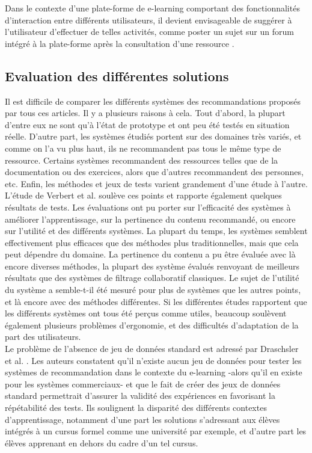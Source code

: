\documentclass[conference]{./sty/IEEEtran}
\begin{document}
Dans le contexte d'une plate-forme de e-learning comportant des fonctionnalités
d'interaction entre différents utilisateurs, il devient envisageable de
suggérer à l'utilisateur d'effectuer de telles activités, comme poster un sujet
sur un forum intégré à la plate-forme après la consultation d'une ressource
\cite{Liou:2014:CPL:2617848.2617854}. \\

\subsection{Evaluation des différentes solutions}

Il est difficile de comparer les différents systèmes des recommandations
proposés par tous ces articles. Il y a plusieurs raisons à cela. Tout d'abord,
la plupart d'entre eux ne sont qu'à l'état de prototype et ont peu été testés
en situation réelle. D'autre part, les systèmes étudiés portent sur des
domaines très variés, et comme on l'a vu plus haut, ils ne recommandent pas
tous le même type de ressource. Certains systèmes recommandent des ressources
telles que de la documentation ou des exercices, alors que d'autres
recommandent des personnes, etc. Enfin, les méthodes et jeux de tests varient
grandement d'une étude à l'autre. \\

L'étude de Verbert et al. \cite{DBLP:journals/tlt/VerbertMOWDBD12} soulève ces
points et rapporte également quelques résultats de tests. Les évaluations ont
pu porter sur l'efficacité des systèmes à améliorer l'apprentissage, sur la
pertinence du contenu recommandé, ou encore sur l'utilité et des différents
systèmes. La plupart du temps, les systèmes semblent effectivement plus
efficaces que des méthodes plus traditionnelles, mais que cela peut dépendre du
domaine. La pertinence du contenu a pu être évaluée avec là encore diverses
méthodes, la plupart des système évalués renvoyant de meilleurs résultats que
des systèmes de filtrage collaboratif classiques. Le sujet de l'utilité du
système a semble-t-il été mesuré pour plus de systèmes que les autres points,
et là encore avec des méthodes différentes. Si les différentes études
rapportent que les différents systèmes ont tous été perçus comme utiles,
beaucoup soulèvent également plusieurs problèmes d'ergonomie, et des
difficultés d'adaptation de la part des utilisateurs.\\

Le problème de l'absence de jeu de données standard est adressé par Draschsler
et al. \cite{DBLP:journals/procedia/DrachslerBVVDMBLSFW10}. Les auteurs
constatent qu'il n'existe aucun jeu de données pour tester les systèmes de
recommandation dans le contexte du e-learning -alors qu'il en existe pour les
systèmes commerciaux- et que le fait de créer des jeux de données standard
permettrait d'assurer la validité des expériences en favorisant la répétabilité
des tests. Ils soulignent la disparité des différents contextes
d'apprentissage, notamment d'une part les solutions s'adressant aux élèves
intégrés à un cursus formel comme une université par exemple, et d'autre part
les élèves apprenant en dehors du cadre d'un tel cursus.\\
\end{document}
